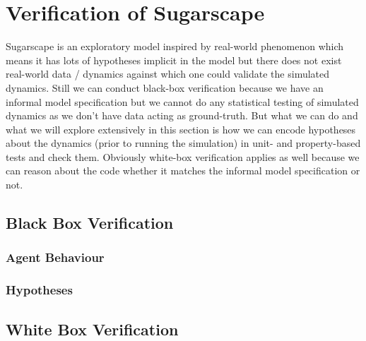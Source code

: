 \section{Verification of Sugarscape}
Sugarscape is an exploratory model inspired by real-world phenomenon which means it has lots of hypotheses implicit in the model but there does not exist real-world data / dynamics against which one could validate the simulated dynamics. Still we can conduct black-box verification because we have an informal model specification but we cannot do any statistical testing of simulated dynamics as we don't have data acting as ground-truth. But what we can do and what we will explore extensively in this section is how we can encode hypotheses about the dynamics (prior to running the simulation) in unit- and property-based tests and check them. Obviously white-box verification applies as well because we can reason about the code whether it matches the informal model specification or not.

\subsection{Black Box Verification}
\subsubsection{Agent Behaviour}

\subsubsection{Hypotheses}

\subsection{White Box Verification}
